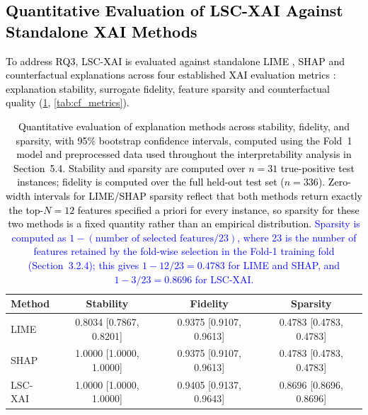 \documentclass[a4paper,fleqn]{cas-sc}
\begin{document}
\subsection{\textcolor{black}{Quantitative Evaluation of LSC-XAI Against Standalone XAI Methods}}
\label{subsec:quant_eval_lsc_xai}
\textcolor{black}{To address RQ3, LSC-XAI is evaluated against standalone LIME \cite{ribeiro2016should}, SHAP \cite{lundberg2017shap} and counterfactual explanations \cite{wachter2017counterfactual} across four established XAI evaluation metrics \cite{nauta2023evaluationsurvey}: explanation stability, surrogate fidelity, feature sparsity and counterfactual quality (\cref{tab:xai_metrics}, \ref{tab:cf_metrics}).}

\begin{table}[pos=H]
\caption{\textcolor{black}{Quantitative evaluation of explanation methods across stability, fidelity, and sparsity, with 95\% bootstrap confidence intervals, computed using the Fold~1 model and preprocessed data
used throughout the interpretability analysis in Section~5.4. Stability and sparsity are computed over $n=31$ true-positive test instances; fidelity is computed over the full held-out test set ($n=336$). Zero-width intervals for LIME/SHAP sparsity reflect that both methods return exactly
the top-$N=12$ features specified a priori for every instance, so sparsity for these two methods is a fixed quantity rather than an empirical distribution. \textcolor{blue}{Sparsity is computed as $1 - (\text{number of selected features} / 23)$, where 23 is the number of features retained by the fold-wise selection in the Fold-1 training fold (Section~3.2.4); this gives $1 - 12/23 = 0.4783$ for LIME and SHAP, and $1 - 3/23 = 0.8696$ for LSC-XAI.}}}
\label{tab:xai_metrics}
\renewcommand{\arraystretch}{1.5}
\begin{tabular}{lccc}
\hline
\textbf{Method} & \textbf{Stability} & \textbf{Fidelity} & \textbf{Sparsity} \\
\hline
LIME     & 0.8034 [0.7867, 0.8201] & 0.9375 [0.9107, 0.9613] & 0.4783 [0.4783, 0.4783] \\
SHAP     & 1.0000 [1.0000, 1.0000] & 0.9375 [0.9107, 0.9613] & 0.4783 [0.4783, 0.4783] \\
LSC-XAI  & 1.0000 [1.0000, 1.0000] & 0.9405 [0.9137, 0.9643] & 0.8696 [0.8696, 0.8696] \\
\hline
\end{tabular}
\end{table}
\end{document}
